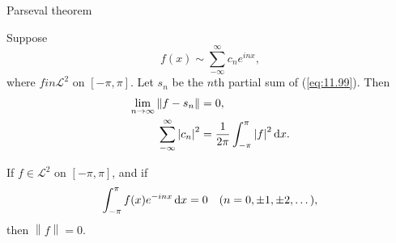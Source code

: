 Parseval theorem 
\begin{thm}
    \label{thm:11.40}
    Suppose 
    \begin{equation}
        \label{eq:11.99}
        f(x) \sim \sum_{-\infty}^{\infty} c_n e^{inx} ,
    \end{equation}
    where $f in \mathscr{L}^2$ on $[-\pi, \pi]$.
    Let $s_n$ be the $n$th partial sum of (\ref{eq:11.99}).
    Then 
    \begin{align}
        \label{eq:11.100}
        \lim_{n \to \infty} \left\| f - s_n \right\| &= 0, \\
        \sum_{-\infty}^{\infty} \left| c_n \right|^2 &= 
        \frac{1}{2\pi} \int_{-\pi}^{\pi} \left| f \right|^2 \d x.
    \end{align}
\end{thm}

\begin{myCorollary*}
    If $f \in \mathscr{L}^2$ on $[-\pi, \pi]$, and if 
    \begin{equation*}
        \int_{-\pi}^{\pi} f(x) e^{-inx} \d x = 0
        \quad (n = 0, \pm 1, \pm 2, \dots),
    \end{equation*}
    then $\left\| f \right\| = 0$.
\end{myCorollary*}
